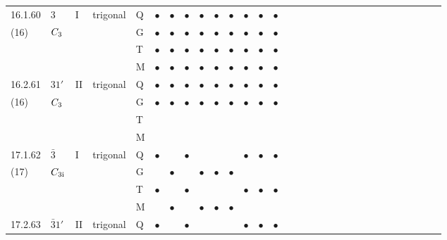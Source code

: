 \documentclass[fleqn,9pt,landscape]{jsarticle}
\begin{document}
\begin{longtable}{lllll|l|l|l|l|l|l|l|l|l|ll|ll|ll|ll|ll|ll|ll|ll}
16.1.60 & \texttt{$3$} & I & trigonal & Q & $\bullet$ & $\bullet$ & $\bullet$ & $\bullet$ & $\bullet$ & $\bullet$ & $\bullet$ & $\bullet$ & $\bullet$ &  &  &  &  &  &  &  &  &  &  &  &  &  &  &  &  \\
(16) & $C_{\rm 3}$ &  &  & G & $\bullet$ & $\bullet$ & $\bullet$ & $\bullet$ & $\bullet$ & $\bullet$ & $\bullet$ & $\bullet$ & $\bullet$ &  &  &  &  &  &  &  &  &  &  &  &  &  &  &  &  \\
 &  &  &  & T & $\bullet$ & $\bullet$ & $\bullet$ & $\bullet$ & $\bullet$ & $\bullet$ & $\bullet$ & $\bullet$ & $\bullet$ &  &  &  &  &  &  &  &  &  &  &  &  &  &  &  &  \\
 &  &  &  & M & $\bullet$ & $\bullet$ & $\bullet$ & $\bullet$ & $\bullet$ & $\bullet$ & $\bullet$ & $\bullet$ & $\bullet$ &  &  &  &  &  &  &  &  &  &  &  &  &  &  &  &  \\ \hline
16.2.61 & \texttt{$31'$} & II & trigonal & Q & $\bullet$ & $\bullet$ & $\bullet$ & $\bullet$ & $\bullet$ & $\bullet$ & $\bullet$ & $\bullet$ & $\bullet$ &  &  &  &  &  &  &  &  &  &  &  &  &  &  &  &  \\
(16) & $C_{\rm 3}$ &  &  & G & $\bullet$ & $\bullet$ & $\bullet$ & $\bullet$ & $\bullet$ & $\bullet$ & $\bullet$ & $\bullet$ & $\bullet$ &  &  &  &  &  &  &  &  &  &  &  &  &  &  &  &  \\
 &  &  &  & T &  &  &  &  &  &  &  &  &  &  &  &  &  &  &  &  &  &  &  &  &  &  &  &  &  \\
 &  &  &  & M &  &  &  &  &  &  &  &  &  &  &  &  &  &  &  &  &  &  &  &  &  &  &  &  &  \\ \hline
17.1.62 & \texttt{$\bar{3}$} & I & trigonal & Q & $\bullet$ &  & $\bullet$ &  &  &  & $\bullet$ & $\bullet$ & $\bullet$ &  &  &  &  &  &  &  &  &  &  &  &  &  &  &  &  \\
(17) & $C_{\rm 3i}$ &  &  & G &  & $\bullet$ &  & $\bullet$ & $\bullet$ & $\bullet$ &  &  &  &  &  &  &  &  &  &  &  &  &  &  &  &  &  &  &  \\
 &  &  &  & T & $\bullet$ &  & $\bullet$ &  &  &  & $\bullet$ & $\bullet$ & $\bullet$ &  &  &  &  &  &  &  &  &  &  &  &  &  &  &  &  \\
 &  &  &  & M &  & $\bullet$ &  & $\bullet$ & $\bullet$ & $\bullet$ &  &  &  &  &  &  &  &  &  &  &  &  &  &  &  &  &  &  &  \\ \hline
17.2.63 & \texttt{$\bar{3}1'$} & II & trigonal & Q & $\bullet$ &  & $\bullet$ &  &  &  & $\bullet$ & $\bullet$ & $\bullet$ &  &  &  &  &  &  &  &  &  &  &  &  &  &  &  &  \\

\end{longtable}
\end{document}

